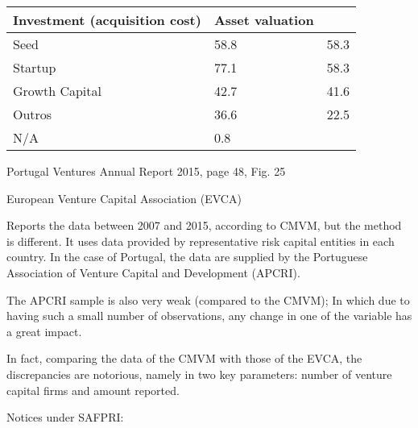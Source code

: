 \documentclass[]{book}
\theoremstyle{definition}
\theoremstyle{definition}
\theoremstyle{definition}
\theoremstyle{remark}
\begin{document}
\begin{longtable}[]{@{}lll@{}}
\toprule
Investment (acquisition cost) & Asset valuation &\tabularnewline
\midrule
\endhead
Seed & 58.8 & 58.3\tabularnewline
Startup & 77.1 & 58.3\tabularnewline
Growth Capital & 42.7 & 41.6\tabularnewline
Outros & 36.6 & 22.5\tabularnewline
N/A & 0.8 &\tabularnewline
\bottomrule
\end{longtable}

Portugal Ventures Annual Report 2015, page 48, Fig. 25

European Venture Capital Association (EVCA)

Reports the data between 2007 and 2015, according to CMVM, but the
method is different. It uses data provided by representative risk
capital entities in each country. In the case of Portugal, the data are
supplied by the Portuguese Association of Venture Capital and
Development (APCRI).

The APCRI sample is also very weak (compared to the CMVM); In which due
to having such a small number of observations, any change in one of the
variable has a great impact.

In fact, comparing the data of the CMVM with those of the EVCA, the
discrepancies are notorious, namely in two key parameters: number of
venture capital firms and amount reported.

Notices under SAFPRI:
\end{document}
